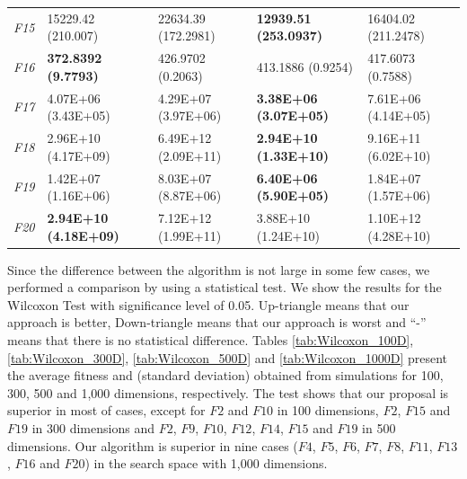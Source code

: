 \begin{table}[!h]
\begin{center}
\begin{tabular}{p{0.5cm}|p{2.5cm}|p{2.5cm}|p{2.5cm}|p{2.5cm}}
\textit{F15}& 15229.42 (210.007) & 22634.39 (172.2981) & \textbf{12939.51 (253.0937)} & 16404.02 (211.2478)\\
\textit{F16}& \textbf{372.8392 (9.7793)} & 426.9702 (0.2063) & 413.1886 (0.9254) & 417.6073 (0.7588)\\
\textit{F17}& 4.07E+06 (3.43E+05) & 4.29E+07 (3.97E+06) & \textbf{3.38E+06 (3.07E+05)} & 7.61E+06 (4.14E+05)\\
\textit{F18}& 2.96E+10 (4.17E+09) & 6.49E+12 (2.09E+11) & \textbf{2.94E+10 (1.33E+10)} & 9.16E+11 (6.02E+10)\\
\textit{F19}& 1.42E+07 (1.16E+06) & 8.03E+07 (8.87E+06) & \textbf{6.40E+06 (5.90E+05)} & 1.84E+07 (1.57E+06)\\
\textit{F20}& \textbf{2.94E+10 (4.18E+09)} & 7.12E+12 (1.99E+11) & 3.88E+10 (1.24E+10) & 1.10E+12 (4.28E+10)\\
\hline
\end{tabular}
\end{center}
\end{table}

Since the difference between the algorithm is not large in some few cases, we performed a comparison by using a statistical test. We show the results for the Wilcoxon Test with significance level of 0.05. Up-triangle means that our approach is better, Down-triangle means that our approach is worst and ``-'' means that there is no statistical difference. Tables \ref{tab:Wilcoxon_100D}, \ref{tab:Wilcoxon_300D}, \ref{tab:Wilcoxon_500D} and \ref{tab:Wilcoxon_1000D} present the average fitness and (standard deviation) obtained from simulations for 100, 300, 500 and 1,000 dimensions, respectively. The test shows that our proposal is superior in most of cases, except for $F2$ and $F10$ in 100 dimensions, $F2$, $F15$ and $F19$ in 300 dimensions and $F2$, $F9$, $F10$, $F12$, $F14$, $F15$ and $F19$ in 500 dimensions. Our algorithm is superior in nine cases ($F4$, $F5$, $F6$, $F7$, $F8$, $F11$, $F13$, $F16$ and $F20$) in the search space with 1,000 dimensions.

